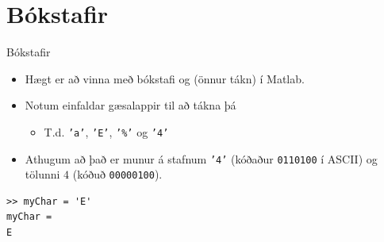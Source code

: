 \documentclass[handout]{beamer}
\begin{document}
\section{Bókstafir}

\begin{frame}[fragile]{Bókstafir}
\begin{itemize}
 \item Hægt er að vinna með bókstafi og (önnur tákn) í Matlab.
 \item Notum einfaldar gæsalappir til að tákna þá
 \begin{itemize}
  \item T.d. \texttt{'a'}, \texttt{'E'}, \texttt{'\%'} og \texttt{'4'}
 \end{itemize}
 \item Athugum að það er munur á stafnum \texttt{'4'} (kóðaður \texttt{0110100} í ASCII) og tölunni $4$ (kóðuð \texttt{00000100}).
\end{itemize}
\begin{verbatim}
>> myChar = 'E'
myChar =
E
\end{verbatim}
\end{frame}
\end{document}
